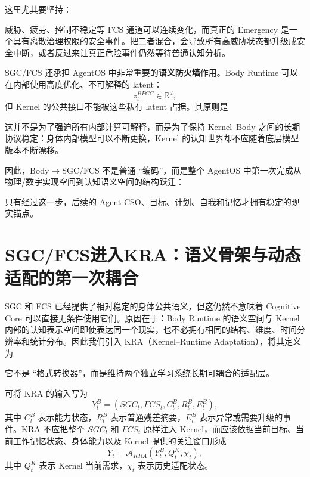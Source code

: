 这里尤其要坚持：
\begin{statementbox}
\centering
{}
\end{statementbox}
威胁、疲劳、控制不稳定等 FCS 通道可以连续变化，而真正的 Emergency 是一个具有离散治理权限的安全事件。把二者混合，会导致所有高威胁状态都升级成安全中断，或者反过来让真正危险事件仍然等待普通认知分析。

SGC/FCS 还承担 AgentOS 中非常重要的\textbf{语义防火墙}作用。Body Runtime 可以在内部使用高度优化、不可解释的 latent：
\[
z_t^{BPCC}\in\mathbb R^d ,
\]
但 Kernel 的公共接口不能被这些私有 latent 占据。其原则是
\begin{statementbox}
\centering
{}
\end{statementbox}
这并不是为了强迫所有内部计算可解释，而是为了保持 Kernel--Body 之间的长期协议稳定：身体内部模型可以不断更换，Kernel 的认知世界却不应随着底层模型版本不断漂移。

因此，Body$\rightarrow$SGC/FCS 不是普通 ``编码''，而是整个 AgentOS 中第一次完成从物理/数字实现空间到认知语义空间的结构跃迁：
\begin{statementbox}
\centering
{}
\end{statementbox}
只有经过这一步，后续的 Agent-CSO、目标、计划、自我和记忆才拥有稳定的现实锚点。


\section{SGC/FCS进入KRA：语义骨架与动态适配的第一次耦合}

SGC 和 FCS 已经提供了相对稳定的身体公共语义，但这仍然不意味着 Cognitive Core 可以直接无条件使用它们。原因在于：Body Runtime 的语义空间与 Kernel 内部的认知表示空间即使表达同一个现实，也不必拥有相同的结构、维度、时间分辨率和统计分布。因此我们引入 KRA（Kernel--Runtime Adaptation），将其定义为
\begin{statementbox}
\centering
{}
\end{statementbox}
它不是 ``格式转换器''，而是维持两个独立学习系统长期可耦合的适配层。

可将 KRA 的输入写为
\[
Y^B_t
=
\left(
SGC_t,
FCS_t,
C^B_t,
R^B_t,
E^B_t
\right),
\]
其中 $C^B_t$ 表示能力状态，$R^B_t$ 表示普通残差摘要，$E^B_t$ 表示异常或需要升级的事件。KRA 不应把整个 $SGC_t$ 和 $FCS_t$ 原样注入 Kernel，而应该依据当前目标、当前工作记忆状态、身体能力以及 Kernel 提供的关注窗口形成
\[
\tilde Y_t
=
\mathcal A_{KRA}
\left(
Y^B_t,
Q^K_t,
\chi_t
\right),
\]
其中 $Q^K_t$ 表示 Kernel 当前需求，$\chi_t$ 表示历史适配状态。

